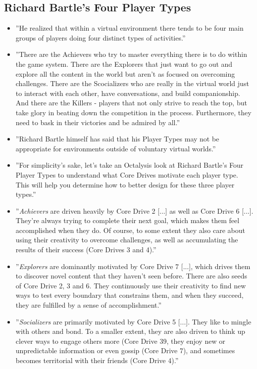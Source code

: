 \subsection{Richard Bartle's Four Player Types}
\begin{itemize}
    \item ''He realized that within a virtual environment there tends to be four main groups of players doing four distinct types of activities.''
    \item ''There are the Achievers who try to master everything there is to do within the game system. There are the Explorers that just want to go out and explore all the content in the world but aren't as focused on overcoming challenges. There are the Scocializers who are really in the virtual world just to interact with each other, have conversations, and build companionship. And there are the Killers - players that not only strive to reach the top, but take glory in beating down the competition in the process. Furthermore, they need to bask in their victories and be admired by all.''
    \item ''Richard Bartle himself has said that his Player Types may not be appropriate for environments outside of voluntary virtual worlds.''
    \item ''For simplicity's sake, let's take an Octalysis look at Richard Bartle's Four Player Types to understand what Core Drives motivate each player type. This will help you determine how to better design for these three player types.''
    \item ''\textit{Achievers} are driven heavily by Core Drive 2 [...] as well as Core Drive 6 [...]. They're always trying to complete their next goal, which makes them feel accomplished when they do. Of course, to some extent they also care about using their creativity to overcome challenges, as well as accumulating the results of their success (Core Drives 3 and 4).''
    \item ''\textit{Explorers} are dominantly motivated by Core Drive 7 [...], which drives them to discover novel content that they haven't seen before. There are also seeds of Core Drive 2, 3 and 6. They continuously use their creativity to find new ways to test every boundary that constrains them, and when they succeed, they are fulfilled by a sense of accomplishment.''
    \item ''\textit{Socializers} are primarily motivated by Core Drive 5 [...]. They like to mingle with others and bond. To a smaller extent, they are also driven to think up clever ways to engage others more (Core Drive 39, they enjoy new or unpredictable information or even gossip (Core Drive 7), and sometimes becomes territorial with their friends (Core Drive 4).''

\end{itemize}
